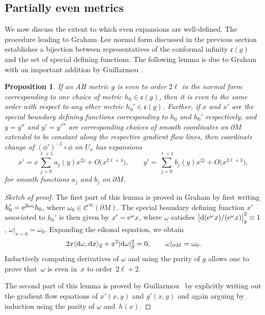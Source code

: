 \documentclass[pdftex]{sigma}
\numberwithin{equation}{section}
\newtheorem{Proposition}[Theorem]{Proposition}
 { \theoremstyle{definition}
\newtheorem{Definition}[Theorem]{Definition}
\newtheorem{Example}[Theorem]{Example}
\newtheorem{Remark}[Theorem]{Remark} }
\newcommand{\del}{\partial}
\newcommand{\olg}{\overline{g}}
\newcommand{\frakc}{\mathfrak c}
\newcommand{\calC}{\mathcal C}
\begin{document}
\subsection{Partially even metrics}

We now discuss the extent to which even expansions are well-defined. The procedure leading to Graham--Lee normal form discussed in the previous section establishes a bijection between representatives of the conformal infinity $\mathfrak c(g)$ and the set of special defining functions. The following lemma is due to Graham \cite{Gr} with an important addition by Guillarmou \cite{Guillarmou}.

\begin{Proposition}\label{proposition1.5}
If an AH metric $g$ is even to order $2\ell$ in the normal form corresponding to one choice of metric $h_0 \in \frakc (g)$,
then it is even to the same order with respect to any other metric $h_0' \in \frakc(g)$. Further, if $x$ and $x'$ are the special boundary defining functions corresponding to $h_0$ and $h_0'$ respectively, and $y = y^{\alpha}$ and $y' = {y'}^{\alpha}$ are corresponding choices of smooth coordinates on $\partial M$ extended to be constant along the respective gradient flow lines, then coordinate change of $(\phi')^{-1}\circ \phi$ on $U_x$ has expansions
\[ x' = x \sum_{j=0}^{\ell+1} a_j(y) x^{2j} + O\big(x^{2\ell+4}\big), \qquad y' = \sum_{j=0}^{\ell+1} b_j(y) x^{2j} + O\big(x^{2\ell+3}\big), \]
for smooth functions $a_j$ and $b_j$ on $\partial M$.
\end{Proposition}
\begin{proof}[Sketch of proof] The first part of this lemma is proved in Graham \cite{Gr} by first writing $h_0' = {\rm e}^{2\omega_0} h_0$, where $\omega_0 \in \calC^\infty(\del M)$. The special boundary defining function $x'$ associated to $h_0'$ is then given by $x' = {\rm e}^{\omega} x$, where $\omega$ satisfies $\big| {\rm d}({\rm e}^\omega x)/ ({\rm e}^\omega x)\big|^2_g \equiv 1$, $\omega|_{x=0} = \omega_0$. Expanding the eikonal equation, we obtain
\begin{gather}\label{eq1.7}
2x \langle {\rm d}\omega, {\rm d}x \rangle_{\olg} + x^2 |{\rm d}\omega|^2_{\olg} = 0, \qquad \omega |_{\del M} = \omega_0.
\end{gather}
Inductively computing derivatives of $\omega$ and using the parity of $g$ allows one to prove that~$\omega$ is even in~$x$ to order~$2 \ell+2$.

The second part of this lemma is proved by Guillarmou~\cite{Guillarmou} by explicitly writing out the gradient flow equations of $x'(x,y)$ and $y'(x,y)$ and again arguing by induction using the parity of $\omega$ and~$h(x)$.
\end{proof}
\end{document}
